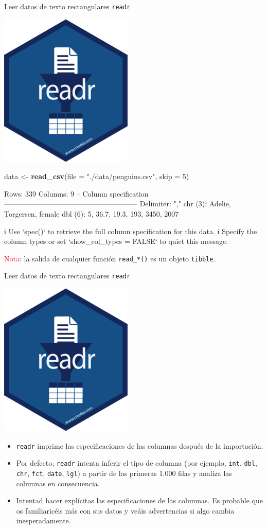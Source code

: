 \documentclass[
  ignorenonframetext,
  aspectratio=169]{beamer}
\newenvironment{Shaded}{\begin{snugshade}}{\end{snugshade}}
\newcommand{\AttributeTok}[1]{\textcolor[rgb]{0.13,0.29,0.53}{#1}}
\newcommand{\DecValTok}[1]{\textcolor[rgb]{0.00,0.00,0.81}{#1}}
\newcommand{\FunctionTok}[1]{\textcolor[rgb]{0.13,0.29,0.53}{\textbf{#1}}}
\newcommand{\NormalTok}[1]{#1}
\newcommand{\OtherTok}[1]{\textcolor[rgb]{0.56,0.35,0.01}{#1}}
\newcommand{\StringTok}[1]{\textcolor[rgb]{0.31,0.60,0.02}{#1}}
\let\oldverbatim\verbatim
\let\endoldverbatim\endverbatim
\renewenvironment{verbatim}{\tiny\oldverbatim}{\endoldverbatim}
\newcommand\red[1]{\textcolor{red}{#1}}
\begin{document}
\begin{frame}[fragile]{Leer datos de texto rectangulares \texttt{readr}}
\label{leer-datos-de-texto-rectangulares-readr-6}
\begin{flushright}\includegraphics[width=0.05\linewidth]{Imgs/logo_readr} \end{flushright}

\begin{Shaded}
\begin{Highlighting}[]
\NormalTok{data }\OtherTok{\textless{}{-}} \FunctionTok{read\_csv}\NormalTok{(}\AttributeTok{file =} \StringTok{"./data/penguins.csv"}\NormalTok{, }\AttributeTok{skip =} \DecValTok{5}\NormalTok{)}
\end{Highlighting}
\end{Shaded}

\begin{verbatim}
Rows: 339 Columns: 9
-- Column specification --------------------------------------------------------
Delimiter: ","
chr (3): Adelie, Torgersen, female
dbl (6): 5, 36.7, 19.3, 193, 3450, 2007

i Use `spec()` to retrieve the full column specification for this data.
i Specify the column types or set `show_col_types = FALSE` to quiet this message.
\end{verbatim}

\red{Nota}: la salida de cualquier función \texttt{read\_*()} es un
objeto \texttt{tibble}.
\end{frame}

\begin{frame}[fragile]{Leer datos de texto rectangulares \texttt{readr}}
\label{leer-datos-de-texto-rectangulares-readr-7}
\begin{flushright}\includegraphics[width=0.05\linewidth]{Imgs/logo_readr} \end{flushright}

\begin{itemize}
\item
  \texttt{readr} imprime las especificaciones de las columnas después de
  la importación.
\item
  Por defecto, \texttt{readr} intenta inferir el tipo de columna (por
  ejemplo, \texttt{int}, \texttt{dbl}, \texttt{chr}, \texttt{fct},
  \texttt{date}, \texttt{lgl}) a partir de las primeras 1.000 filas y
  analiza las columnas en consecuencia.
\item
  Intentad hacer explícitas las especificaciones de las columnas. Es
  probable que os familiaricéis más con sus datos y veáis advertencias
  si algo cambia inesperadamente.
\end{itemize}
\end{frame}
\end{document}
